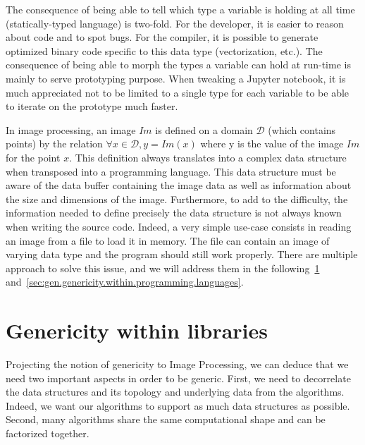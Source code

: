 The consequence of being able to tell which type a variable is holding at all time (statically-typed language) is
two-fold. For the developer, it is easier to reason about code and to spot bugs. For the compiler, it is possible to
generate optimized binary code specific to this data type (vectorization, etc.). The consequence of being able to morph
the types a variable can hold at run-time is mainly to serve prototyping purpose. When tweaking a Jupyter notebook, it
is much appreciated not to be limited to a single type for each variable to be able to iterate on the prototype much
faster.

In image processing, an image \(Im\) is defined on a domain \(\mathcal{D}\) (which contains points) by the relation
\(\forall x \in \mathcal{D}, y = Im(x)\) where y is the value of the image \(Im\) for the point \(x\). This definition
always translates into a complex data structure when transposed into a programming language. This data structure must be
aware of the data buffer containing the image data as well as information about the size and dimensions of the image.
Furthermore, to add to the difficulty, the information needed to define precisely the data structure is not always known
when writing the source code. Indeed, a very simple use-case consists in reading an image from a file to load it in
memory. The file can contain an image of varying data type and the program should still work properly. There are
multiple approach to solve this issue, and we will address them in the following~\cref{sec:gen.within.libraries}
and~\cref{sec:gen.genericity.within.programming.languages}.



\section{Genericity within libraries}
\label{sec:gen.within.libraries}

Projecting the notion of genericity to Image Processing, we can deduce that we need two important aspects in order to be
generic. First, we need to decorrelate the data structures and its topology and underlying data from the algorithms.
Indeed, we want our algorithms to support as much data structures as possible. Second, many algorithms share the same
computational shape and can be factorized together.

